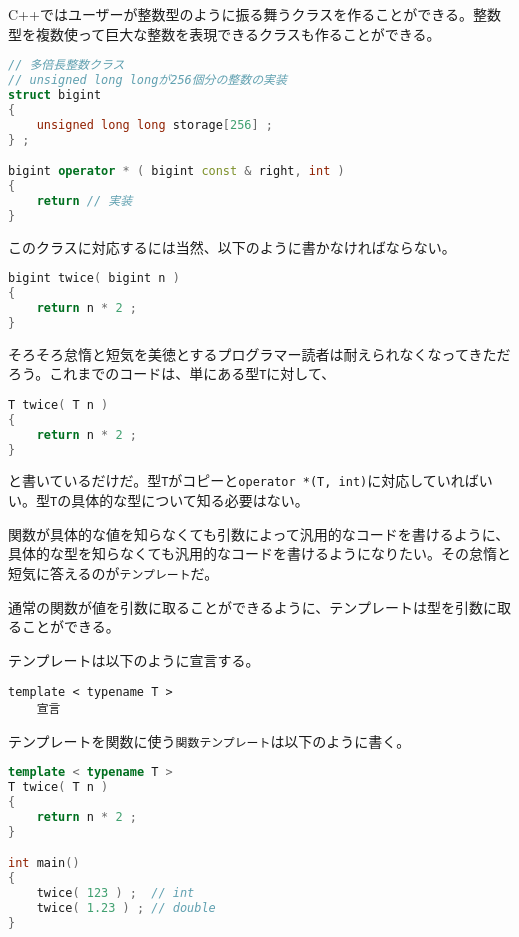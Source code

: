 C++ではユーザーが整数型のように振る舞うクラスを作ることができる。整数型を複数使って巨大な整数を表現できるクラスも作ることができる。

\begin{lstlisting}[language={C++}]
// 多倍長整数クラス
// unsigned long longが256個分の整数の実装
struct bigint
{
    unsigned long long storage[256] ;
} ;

bigint operator * ( bigint const & right, int )
{
    return // 実装
}
\end{lstlisting}

このクラスに対応するには当然、以下のように書かなければならない。

\begin{lstlisting}[language={C++}]
bigint twice( bigint n )
{
    return n * 2 ;
}
\end{lstlisting}

そろそろ怠惰と短気を美徳とするプログラマー読者は耐えられなくなってきただろう。これまでのコードは、単にある型\texttt{T}に対して、
\begin{lstlisting}[language={C++}]
T twice( T n )
{
    return n * 2 ;
}
\end{lstlisting}
と書いているだけだ。型\texttt{T}がコピーと\texttt{operator *(T, int)}に対応していればいい。型\texttt{T}の具体的な型について知る必要はない。

関数が具体的な値を知らなくても引数によって汎用的なコードを書けるように、具体的な型を知らなくても汎用的なコードを書けるようになりたい。その怠惰と短気に答えるのが\texttt{テンプレート}だ。


通常の関数が値を引数に取ることができるように、テンプレートは型を引数に取ることができる。

テンプレートは以下のように宣言する。

\begin{lstlisting}[style=grammar]
template < typename T >
    宣言 
\end{lstlisting}

テンプレートを関数に使う\texttt{関数テンプレート}は以下のように書く。

\begin{lstlisting}[language={C++}]
template < typename T >
T twice( T n )
{
    return n * 2 ;
}

int main()
{
    twice( 123 ) ;  // int
    twice( 1.23 ) ; // double 
}
\end{lstlisting}

